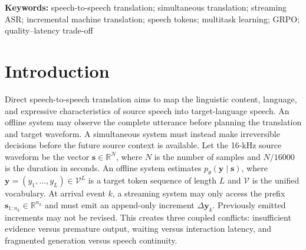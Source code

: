 \documentclass[11pt,a4paper]{article}
\newcommand{\vect}[1]{\bm{#1}}
\newcommand{\R}{\mathbb{R}}
\newcommand{\Vocab}{\mathcal{V}}
\begin{document}
\begin{abstract}
Building on these findings, we formulate a future quality-aware Group Relative Policy Optimization (GRPO) stage. For each input, the policy samples multiple READ/WRITE--content--audio trajectories and receives a reward combining final translation quality, prefix support, First WRITE, average token delay, completeness, non-silence, and boundary continuity, with reference-policy KL regularization. Earlier action-only GRPO experiments show why this extension is needed: a group-size-8 policy improves Chinese-to-English Text-BLEU by 1.87 over matched continued SFT, but increases First WRITE by 41.85\,ms. Reward-v2 experiments provide preliminary evidence that bilingual quality terms and adaptive KL can reduce ATD by 24.7--46.5\,ms without necessarily sacrificing both directions. The principal contributions of this work are a reproducible unified-token offline curriculum, Phase-3-anchored causal acoustic adaptation, trajectory-routed joint incremental training in a single shared decoder, and an evaluation framework that explicitly separates verified gains, failed gates, proxy latency, and proposed reinforcement learning.
\end{abstract}

\noindent\textbf{Keywords:} speech-to-speech translation; simultaneous translation; streaming ASR; incremental machine translation; speech tokens; multitask learning; GRPO; quality--latency trade-off

\section{Introduction}

Direct speech-to-speech translation aims to map the linguistic content, language, and expressive characteristics of source speech into target-language speech. An offline system may observe the complete utterance before planning the translation and target waveform. A simultaneous system must instead make irreversible decisions before the future source context is available. Let the 16-kHz source waveform be the vector $\vect{s}\in\R^{N}$, where $N$ is the number of samples and $N/16000$ is the duration in seconds. An offline system estimates $p_\theta(\vect{y}\mid\vect{s})$, where $\vect{y}=(y_1,\ldots,y_L)\in\Vocab^L$ is a target token sequence of length $L$ and $\Vocab$ is the unified vocabulary. At arrival event $k$, a streaming system may only access the prefix $\vect{s}_{1:n_k}\in\R^{n_k}$ and must emit an append-only increment $\Delta\vect{y}_k$. Previously emitted increments may not be revised. This creates three coupled conflicts: insufficient evidence versus premature output, waiting versus interaction latency, and fragmented generation versus speech continuity.
\end{document}
